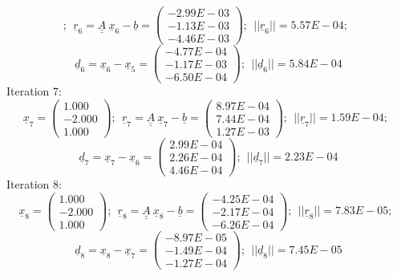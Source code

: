\documentclass{report}[10pts]
\begin{document}
\begin{small}
\[;~~
\underline{r}_{6}=
\underline{\underline{A}}~\underline{x}_{6}-
\underline{b}=
   \begin{pmatrix}
   -2.99E-03 \\ -1.13E-03 \\ -4.46E-03
   \end{pmatrix}
;~~
||
\underline{r}_{6}
||=
5.57E-04
;~~
\]
\[
\underline{d}_{6}=
\underline{x}_{6}-
\underline{x}_{5}=
   \begin{pmatrix}
   -4.77E-04 \\ -1.17E-03 \\ -6.50E-04
   \end{pmatrix}
;~~
||
\underline{d}_{6}
||=
5.84E-04
\]
Iteration 7:
\[
\underline{x}_{7}=
   \begin{pmatrix}
   1.000 \\ -2.000 \\ 1.000
   \end{pmatrix}
;~~
\underline{r}_{7}=
\underline{\underline{A}}~\underline{x}_{7}-
\underline{b}=
   \begin{pmatrix}
   8.97E-04 \\ 7.44E-04 \\ 1.27E-03
   \end{pmatrix}
;~~
||
\underline{r}_{7}
||=
1.59E-04
;~~
\]
\[
\underline{d}_{7}=
\underline{x}_{7}-
\underline{x}_{6}=
   \begin{pmatrix}
   2.99E-04 \\ 2.26E-04 \\ 4.46E-04
   \end{pmatrix}
;~~
||
\underline{d}_{7}
||=
2.23E-04
\]
Iteration 8:
\[
\underline{x}_{8}=
   \begin{pmatrix}
   1.000 \\ -2.000 \\ 1.000
   \end{pmatrix}
;~~
\underline{r}_{8}=
\underline{\underline{A}}~\underline{x}_{8}-
\underline{b}=
   \begin{pmatrix}
   -4.25E-04 \\ -2.17E-04 \\ -6.26E-04
   \end{pmatrix}
;~~
||
\underline{r}_{8}
||=
7.83E-05
;~~
\]
\[
\underline{d}_{8}=
\underline{x}_{8}-
\underline{x}_{7}=
   \begin{pmatrix}
   -8.97E-05 \\ -1.49E-04 \\ -1.27E-04
   \end{pmatrix}
;~~
||
\underline{d}_{8}
||=
7.45E-05
\]
\end{small}
\end{document}
